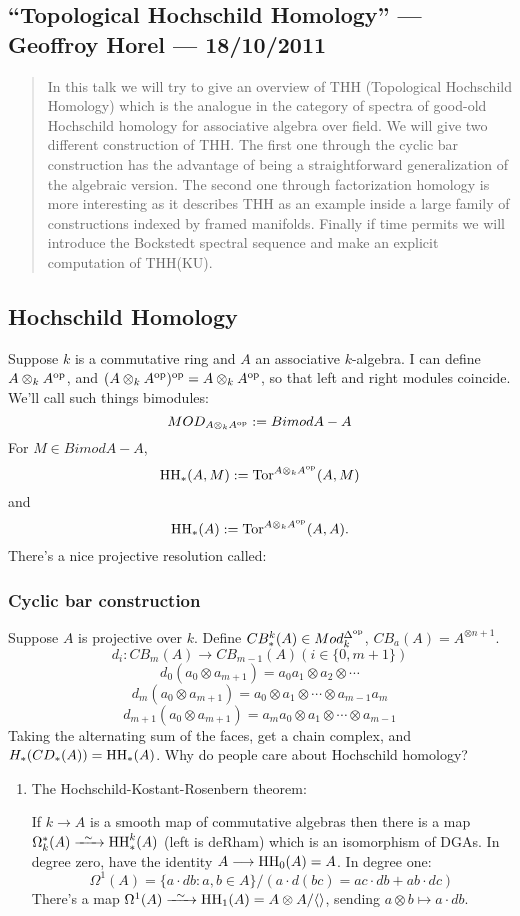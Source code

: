 \documentclass[11pt]{article}
\newcommand{\KanSemResponse}[1]
{
\thispagestyle{fancy}
\subsection*{#1}
}
\begin{document}
\begin{GeoffroyTopologicalHochschildHomology}
\newcommand{\THH}{\textup{THH}}
\newcommand{\HH}{\textup{HH}}
\KanSemResponse
{``Topological Hochschild Homology'' --- Geoffroy Horel --- 18/10/2011}
\begin{abstract}
In this talk we will try to give an overview of THH
(Topological Hochschild Homology) which is the analogue in the category of
spectra of good-old Hochschild homology for associative algebra over field.
We will give two different construction of THH. The first one through the
cyclic bar construction has the advantage of being a straightforward
generalization of the algebraic version. The second one through
factorization homology is more interesting as it describes THH as an
example inside a large family of constructions indexed by framed manifolds.
Finally if time permits we will introduce the Bockstedt spectral sequence
and make an explicit computation of THH(KU).
\end{abstract}
\subsection*{Hochschild Homology}
Suppose $k$ is a commutative ring and $A$ an associative $k$-algebra. I can define $A\otimes_k A^{\textup{op}}$, and $(A\otimes_k A^{\textup{op}})^{\textup{op}}=A\otimes_k A^{\textup{op}}$, so that left and right modules coincide. We'll call such things bimodules:
\[MOD_{A\otimes_k A^{\textup{op}}}:=Bimod{A-A}\]
For $M\in Bimod{A-A}$, 
\[\HH_*(A,M):=\Tor^{A\otimes_k A^\op}(A,M)\]
and 
\[\HH_*(A):=\Tor^{A\otimes_k A^\op}(A,A).\]
There's a nice projective resolution called:
\subsubsection*{Cyclic bar construction}
Suppose $A$ is projective over $k$. Define $CB_*^k(A)\in Mod_k^{\Delta^{\textup{op}}}$, $CB_a(A)=A^{\otimes n+1}$.
\[d_i:CB_m(A)\to CB_{m-1}(A) (i\in\{0,m+1\})\]
\[d_0(a_0\otimes a_{m+1})=a_0a_1\otimes a_2\otimes\cdots\]
\[d_m(a_0\otimes a_{m+1})=a_0\otimes a_1\otimes\cdots\otimes a_{m-1}a_{m}\]
\[d_{m+1}(a_0\otimes a_{m+1})=a_ma_0\otimes a_1\otimes\cdots\otimes a_{m-1}\]
Taking the alternating sum of the faces, get a chain complex, and
$H_*(CD_*(A))=\HH_*(A)$.
Why do people care about Hochschild homology?
\begin{enumerate}
\item The Hochschild-Kostant-Rosenbern theorem:
\begin{thm*}
If $k\to A$ is a smooth map of commutative algebras then there is a map $\Omega_k^*(A)\weakequiv \HH_*^k(A)$ (left is deRham) which is an isomorphism of DGAs. In degree zero, have the identity $A\to\HH_0(A)=A$. In degree one:
\[\Omega^1(A)=\{a\cdot db:a,b\in A\}/(a\cdot d(bc)=ac\cdot db+ab\cdot dc)\]
There's a map $\Omega^1(A)\weakequiv\HH_1(A)=A\otimes A/\langle\rangle$, sending $a\otimes b\mapsto a\cdot db$.


\end{thm*}
\end{enumerate}
\end{GeoffroyTopologicalHochschildHomology}
\end{document}

